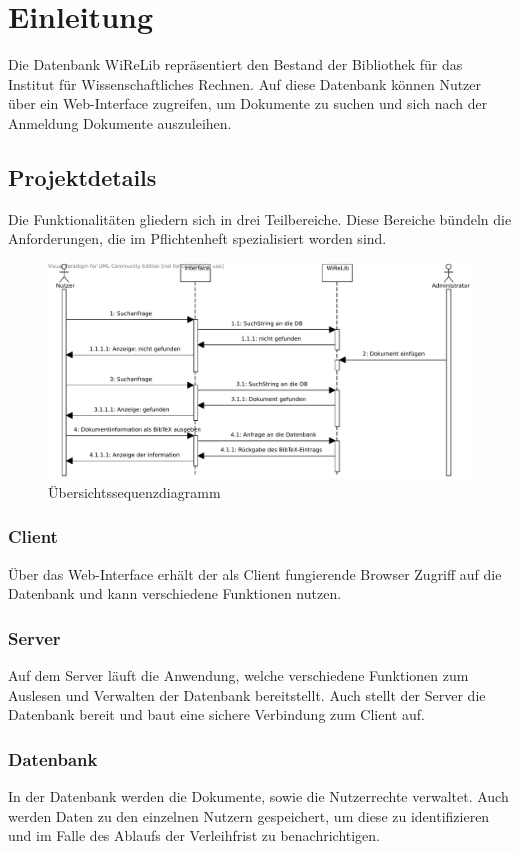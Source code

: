 
\chapter{Einleitung}
Die Datenbank WiReLib repräsentiert den Bestand der Bibliothek für das Institut für Wissenschaftliches Rechnen.
Auf diese Datenbank können Nutzer über ein Web-Interface zugreifen, um Dokumente zu suchen und sich nach der Anmeldung Dokumente auszuleihen.

\section{Projektdetails}
Die Funktionalitäten gliedern sich in drei Teilbereiche.
Diese Bereiche bündeln die Anforderungen, die im Pflichtenheft spezialisiert
worden sind.

\begin{figure}[h]
\begin{center}
\includegraphics[width=0.8\linewidth]{bilder/Seq-Uebersicht.pdf}
\caption[Übersichtssequenzdiagramm]{Übersichtssequenzdiagramm}
\label{fig:Seqü}
\end{center}
\end{figure}

\subsection{Client}
Über das Web-Interface erhält der als Client fungierende Browser Zugriff auf die Datenbank und kann verschiedene Funktionen nutzen.

\subsection{Server}
Auf dem Server läuft die Anwendung, welche verschiedene Funktionen zum Auslesen und Verwalten der Datenbank bereitstellt. 
Auch stellt der Server die Datenbank bereit und baut eine sichere Verbindung zum Client auf.

\subsection{Datenbank}
In der Datenbank werden die Dokumente, sowie die Nutzerrechte verwaltet.
Auch werden Daten zu den einzelnen Nutzern gespeichert, um diese zu identifizieren und im Falle des Ablaufs der Verleihfrist zu benachrichtigen.
